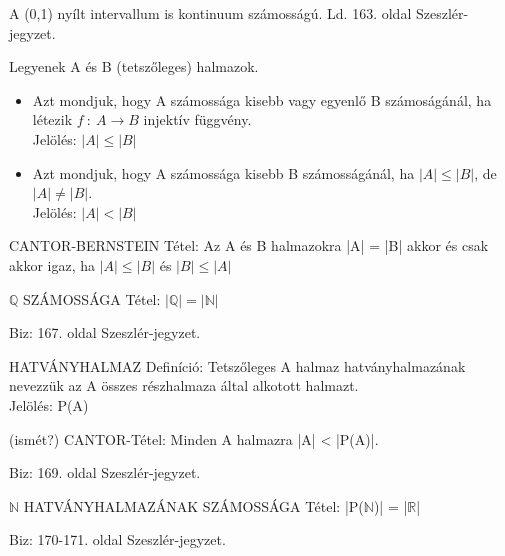 A (0,1) nyílt intervallum is kontinuum számosságú. Ld. 163. oldal Szeszlér-jegyzet.
\begin{shaded}
Legyenek A és B (tetszőleges) halmazok.
\begin{itemize}
\item Azt mondjuk, hogy A számossága kisebb vagy egyenlő B számoságánál, ha létezik $f\::\:A \to B$ injektív függvény.\\
Jelölés: $|A| \leq |B|$
\item Azt mondjuk, hogy A számossága kisebb B számosságánál, ha $|A| \leq |B|$, de $|A| \neq |B|$.\\
Jelölés: $|A| < |B|$
\end{itemize}
\end{shaded}
\begin{framed}
CANTOR-BERNSTEIN Tétel: Az A és B halmazokra |A| = |B| akkor és csak akkor igaz, ha $|A| \leq |B|$ és $|B| \leq |A|$
\end{framed}
\begin{framed}
$\mathbb{Q}$ SZÁMOSSÁGA Tétel: $|\mathbb{Q}| = |\mathbb{N}|$
\end{framed}
\begin{leftbar}
Biz: 167. oldal Szeszlér-jegyzet.
\end{leftbar}
\begin{shaded}
HATVÁNYHALMAZ Definíció: Tetszőleges A halmaz hatványhalmazának nevezzük az A összes részhalmaza által alkotott halmazt.\\
Jelölés: P(A)
\end{shaded}
\begin{framed}
(ismét?) CANTOR-Tétel: Minden A halmazra |A| < |P(A)|.
\end{framed}
\begin{leftbar}
Biz: 169. oldal Szeszlér-jegyzet.
\end{leftbar}
\begin{framed}
$\mathbb{N}$ HATVÁNYHALMAZÁNAK SZÁMOSSÁGA Tétel: |P($\mathbb{N}$)| = |$\mathbb{R}$|
\end{framed}
\begin{leftbar}
Biz: 170-171. oldal Szeszlér-jegyzet.
\end{leftbar}
